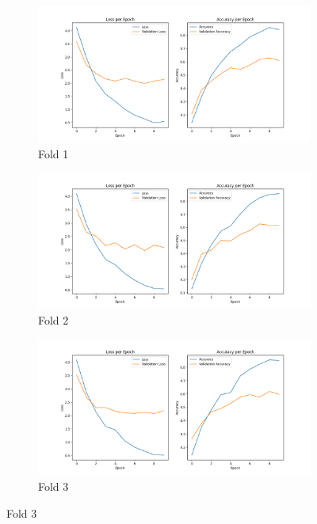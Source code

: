 \documentclass[10pt,english,a4paper]{report}
\begin{document}
\begin{figure}[!ht]
    \centering
    \begin{subfigure}[b]{0.4\textwidth}
        \includegraphics[width=\textwidth]{figures/training/learning_curve_fold_1.png}
        \caption{Fold 1}
        \label{fig:plot1}
    \end{subfigure}
    \hfill
    \begin{subfigure}[b]{0.4\textwidth}
        \includegraphics[width=\textwidth]{figures/training/learning_curve_fold_2.png}
        \caption{Fold 2}
        \label{fig:plot2}
    \end{subfigure}
    \hfill
    \begin{subfigure}[b]{0.4\textwidth}
        \includegraphics[width=\textwidth]{figures/training/learning_curve_fold_3.png}
        \caption{Fold 3}
        \label{fig:plot3}
    \end{subfigure}
   

\end{figure}
\end{document}
